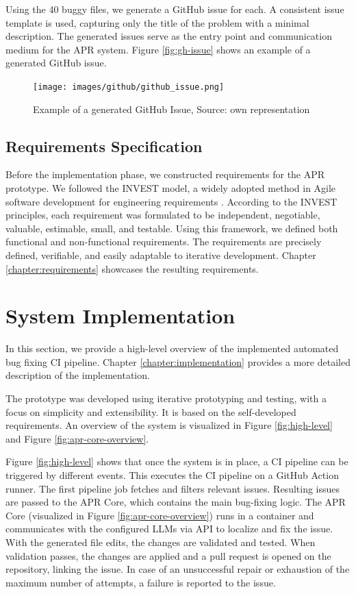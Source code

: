 Using the 40 buggy files, we generate a GitHub issue for each. A consistent issue template is used, capturing only the title of the problem with a minimal description. The generated issues serve as the entry point and communication medium for the APR system. Figure \ref{fig:gh-issue} shows an example of a generated GitHub issue.

\begin{figure}[H]
    \centering
    \texttt{[image: images/github/github\_issue.png]}
    \caption{Example of a generated GitHub Issue, Source: own representation}
    \label{fig:gh-issue2}
\end{figure}

\subsection{Requirements Specification}

Before the implementation phase, we constructed requirements for the \ac{APR} prototype. We followed the INVEST model, a widely adopted method in Agile software development for engineering requirements \cite{10.5555/984017}. According to the INVEST principles, each requirement was formulated to be independent, negotiable, valuable, estimable, small, and testable. Using this framework, we defined both functional and non-functional requirements. The requirements are precisely defined, verifiable, and easily adaptable to iterative development. Chapter \ref{chapter:requirements} showcases the resulting requirements.

\section{System Implementation}

In this section, we provide a high-level overview of the implemented automated bug fixing \ac{CI} pipeline. Chapter \ref{chapter:implementation} provides a more detailed description of the implementation.

The prototype was developed using iterative prototyping and testing, with a focus on simplicity and extensibility. It is based on the self-developed requirements. An overview of the system is visualized in Figure \ref{fig:high-level} and Figure \ref{fig:apr-core-overview}.

Figure \ref{fig:high-level} shows that once the system is in place, a \ac{CI} pipeline can be triggered by different events. This executes the CI pipeline on a GitHub Action runner. The first pipeline job fetches and filters relevant issues. Resulting issues are passed to the APR Core, which contains the main bug-fixing logic. The APR Core (visualized in Figure \ref{fig:apr-core-overview}) runs in a container and communicates with the configured \acp{LLM} via API to localize and fix the issue. With the generated file edits, the changes are validated and tested. When validation passes, the changes are applied and a pull request is opened on the repository, linking the issue. In case of an unsuccessful repair or exhaustion of the maximum number of attempts, a failure is reported to the issue.

